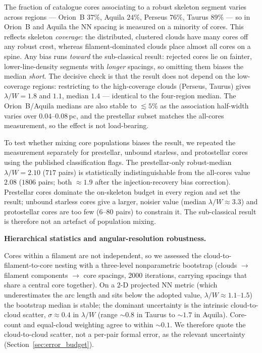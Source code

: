 \documentclass[usenatbib,twoside,twocolumn]{mnras}
\begin{document}
The fraction of catalogue cores associating to a robust skeleton segment varies across regions --- Orion~B $37\%$, Aquila $24\%$, Perseus $76\%$, Taurus $89\%$ --- so in Orion~B and Aquila the NN spacing is measured on a minority of cores. This reflects skeleton \emph{coverage}: the distributed, clustered clouds have many cores off any robust crest, whereas filament-dominated clouds place almost all cores on a spine. Any bias runs \emph{toward} the sub-classical result: rejected cores lie on fainter, lower-line-density segments with \emph{longer} spacings, so omitting them biases the median \emph{short}. The decisive check is that the result does not depend on the low-coverage regions: restricting to the high-coverage clouds (Perseus, Taurus) gives $\lambda/W=1.8$ and $1.1$, median $1.4$ --- identical to the four-region median. The Orion~B/Aquila medians are also stable to $\lesssim5\%$ as the association half-width varies over $0.04$--$0.08$\,pc, and the prestellar subset matches the all-cores measurement, so the effect is not load-bearing.

To test whether mixing core populations biases the result, we repeated the measurement separately for prestellar, unbound starless, and protostellar cores using the published classification flags. The prestellar-only robust-median $\lambda/W=2.10$ ($717$ pairs) is statistically indistinguishable from the all-cores value $2.08$ ($1806$ pairs; both $\approx1.9$ after the injection-recovery bias correction). Prestellar cores dominate the on-skeleton budget in every region and set the result; unbound starless cores give a larger, noisier value (median $\lambda/W\approx3.3$) and protostellar cores are too few ($6$--$80$ pairs) to constrain it. The sub-classical result is therefore not an artefact of population mixing.

\smallskip\noindent\textbf{Hierarchical statistics and angular-resolution robustness.}

Cores within a filament are not independent, so we assessed the cloud-to-filament-to-core nesting with a three-level nonparametric bootstrap (clouds $\to$ filament components $\to$ core spacings, 2000 iterations, carrying spacings that share a central core together). On a 2-D projected NN metric (which underestimates the arc length and sits below the adopted value, $\lambda/W\approx1.1$--$1.5$) the bootstrap median is stable; the dominant uncertainty is the intrinsic cloud-to-cloud scatter, $\sigma\approx0.4$ in $\lambda/W$ (range $\sim0.8$ in Taurus to $\sim1.7$ in Aquila). Core-count and equal-cloud weighting agree to within $\sim0.1$. We therefore quote the cloud-to-cloud scatter, not a per-pair formal error, as the relevant uncertainty (Section~\ref{sec:error_budget}).
\end{document}
